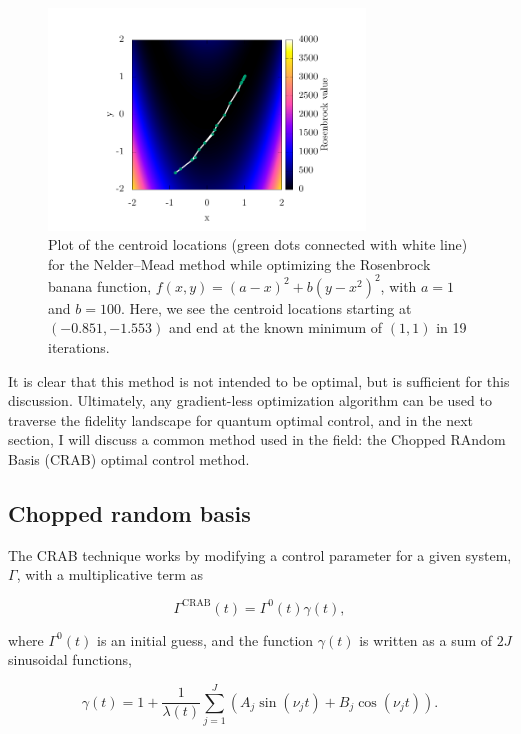 \begin{figure}
\center \includegraphics[width=0.75\textwidth]{data/1d/NM/NM.pdf}
\caption{Plot of the centroid locations (green dots connected with white line) for the Nelder--Mead method while optimizing the Rosenbrock banana function, $f(x,y)=(a-x)^2+b(y-x^2)^2$, with $a=1$ and $b=100$. Here, we see the centroid locations starting at $(-0.851,-1.553)$ and end at the known minimum of $(1,1)$ in 19 iterations.}
\label{fig:minimize_NM}
\end{figure}

It is clear that this method is not intended to be optimal, but is sufficient for this discussion.
Ultimately, any gradient-less optimization algorithm can be used to traverse the fidelity landscape for quantum optimal control, and in the next section, I will discuss a common method used in the field: the Chopped RAndom Basis (CRAB) optimal control method.

\subsection{Chopped random basis}
\label{sec:CRAB}

The CRAB technique works by modifying a control parameter for a given system, $\Gamma$, with a multiplicative term as

\begin{equation}
\Gamma^{\text{CRAB}}(t) = \Gamma^0(t)\gamma(t),
\end{equation}

\noindent where $\Gamma^0(t)$ is an initial guess, and the function $\gamma(t)$ is written as a sum of $2J$ sinusoidal functions,

\begin{equation}
\gamma(t)=1+\frac{1}{\lambda(t)}\sum_{j=1}^J(A_j \sin(\nu_jt) + B_j\cos(\nu_jt)).
\end{equation}


